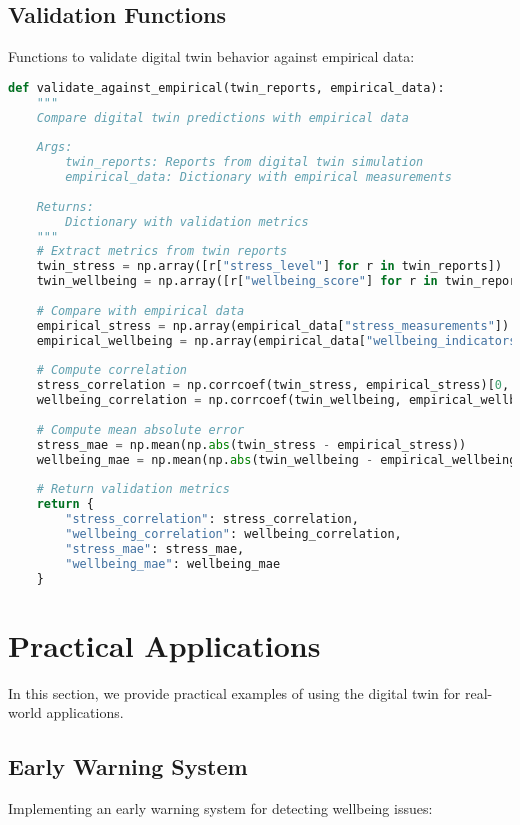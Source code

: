 \documentclass[11pt,a4paper]{article}
\begin{document}
\subsection{Validation Functions}
Functions to validate digital twin behavior against empirical data:

\begin{lstlisting}[language=Python]
def validate_against_empirical(twin_reports, empirical_data):
    """
    Compare digital twin predictions with empirical data
    
    Args:
        twin_reports: Reports from digital twin simulation
        empirical_data: Dictionary with empirical measurements
        
    Returns:
        Dictionary with validation metrics
    """
    # Extract metrics from twin reports
    twin_stress = np.array([r["stress_level"] for r in twin_reports])
    twin_wellbeing = np.array([r["wellbeing_score"] for r in twin_reports])
    
    # Compare with empirical data
    empirical_stress = np.array(empirical_data["stress_measurements"])
    empirical_wellbeing = np.array(empirical_data["wellbeing_indicators"])
    
    # Compute correlation
    stress_correlation = np.corrcoef(twin_stress, empirical_stress)[0, 1]
    wellbeing_correlation = np.corrcoef(twin_wellbeing, empirical_wellbeing)[0, 1]
    
    # Compute mean absolute error
    stress_mae = np.mean(np.abs(twin_stress - empirical_stress))
    wellbeing_mae = np.mean(np.abs(twin_wellbeing - empirical_wellbeing))
    
    # Return validation metrics
    return {
        "stress_correlation": stress_correlation,
        "wellbeing_correlation": wellbeing_correlation,
        "stress_mae": stress_mae,
        "wellbeing_mae": wellbeing_mae
    }
\end{lstlisting}

\section{Practical Applications}
In this section, we provide practical examples of using the digital twin for real-world applications.


\subsection{Early Warning System}
Implementing an early warning system for detecting wellbeing issues:
\end{document}
